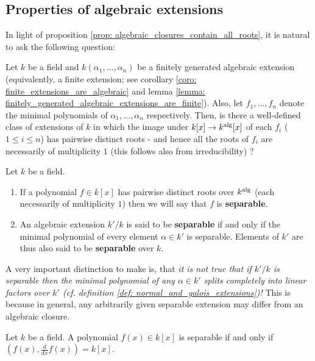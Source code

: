     \subsection{Properties of algebraic extensions}
        
        In light of proposition \ref{prop: algebraic_closures_contain_all_roots}, it is natural to ask the following question:
        \begin{question}
            Let $k$ be a field and $k(\alpha_1, ..., \alpha_n)$ be a finitely generated algebraic extension (equivalently, a finite extension; see corollary \ref{coro: finite_extensions_are_algebraic} and lemma \ref{lemma: finitely_generated_algebraic_extensions_are_finite}). Also, let $f_1, ..., f_n$ denote the minimal polynomials of $\alpha_1, ..., \alpha_n$ respectively. Then, is there a well-defined class of extensions of $k$ in which the image under $k[x] \to k^{\mathrm{alg}}[x]$ of each $f_i$ ($1 \leq i \leq n$) has pairwise distinct roots - and hence all the roots of $f_i$ are necessarily of multiplicity $1$ (this follows also from irreducibility) ?
        \end{question}
        \begin{definition} \label{def: separable_extensions} 
            Let $k$ be a field.
            \begin{enumerate}
                \item If a polynomial $f \in k[x]$ has pairwise distinct roots over $k^{\mathrm{alg}}$ (each necessarily of multiplicity $1$) then we will say that $f$ is \textbf{separable}.
                \item An algebraic extension $k'/k$ is said to be \textbf{separable} if and only if the minimal polynomial of every element $\alpha \in k'$ is separable. Elements of $k'$ are thus also said to be \textbf{separable} over $k$.
            \end{enumerate}
        \end{definition}
        \begin{remark}
            A very important distinction to make is, that \textit{it is not true that if $k'/k$ is separable then the minimal polynomial of any $\alpha \in k'$ splits completely into linear factors over $k'$ (cf. definition \ref{def: normal_and_galois_extensions})!} This is because in general, any arbitrarily given separable extension may differ from an algebraic closure. 
        \end{remark}
        \begin{lemma} \label{lemma: separability_criterion_for_polynomials}
            Let $k$ be a field. A polynomial $f(x) \in k[x]$ is separable if and only if $\left(f(x), \frac{d}{dx} f(x)\right) = k[x]$.
        \end{lemma}
